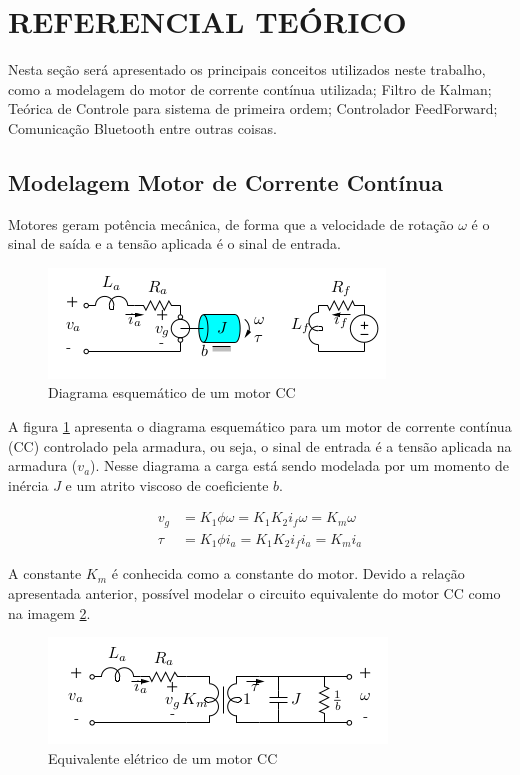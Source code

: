 \section{REFERENCIAL TEÓRICO}
Nesta seção será apresentado os principais conceitos utilizados neste trabalho, como a modelagem do motor de corrente contínua utilizada; Filtro de Kalman; Teórica de Controle para sistema de primeira ordem; Controlador FeedForward; Comunicação Bluetooth entre outras coisas.

\subsection{Modelagem Motor de Corrente Contínua}
Motores geram potência mecânica, de forma que a velocidade de rotação $\omega$ é o sinal de saída e a tensão aplicada é o sinal de entrada. 

\begin{figure}[H]
    \centering
    \includegraphics{imagens/ilustracoes/motor_cc_diagrama_modelo.png}
    \caption{Diagrama esquemático de um motor CC}
    \label{fig:modelo_motorcc}
\end{figure}

A figura \ref{fig:modelo_motorcc} apresenta o diagrama esquemático para um motor de corrente contínua (CC) controlado pela armadura, ou seja, o sinal de entrada é a tensão aplicada na armadura ($v_a$). Nesse diagrama a carga está sendo modelada por um momento de inércia $J$ e um atrito viscoso de coeficiente $b$.

\begin{align*}
    v_g &= K_{1}\phi\omega= K_{1}K_{2}i_{f}\omega = K_{m}\omega\\
    \tau &= K_{1} \phi i_{a}= K_{1} K_{2}i_{f} i_{a} = K_{m}i_{a}
\end{align*}

A constante $K_{m}$ é conhecida como a constante do motor. Devido a relação apresentada anterior, possível modelar o circuito equivalente do motor CC como na imagem \ref{fig:eq_eletrico_motorcc}.
\begin{figure}[H]
    \centering
    \includegraphics{imagens/ilustracoes/motor_cc_eq_eletrico.png}
    \caption{Equivalente elétrico de um motor CC}
    \label{fig:eq_eletrico_motorcc}
\end{figure}

